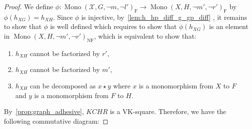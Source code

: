 \begin{proof}
       
        We define $\phi: \operatorname{Mono}(\mathcal{X},G,\lnot m, \lnot l')_{\operatorname{F}} \to \operatorname{Mono}(X,H,\lnot m', \lnot r')_{\operatorname{F}}$ 
        by $\phi(h_{XG}) = h_{XH}$. Since $\phi$ is injective, by~\autoref{lem:h_hp_diff_g_gp_diff} , it remains to show that $\phi$ is well defined which requires to show that $\phi(h_{XG})$ is an element in $\operatorname{Mono}(X,H,\lnot m', \lnot r')_{\operatorname{NF}}$, which is equivalent to show that:
        \begin{enumerate}
            \item $h_{XH}$ cannot be factorized by $r'$,
            \item $h_{XH}$ cannot be factorized by $m'$,
            \item $h_{XH}$ can be decomposed as $x \star y$ where $x$ is a monomorphism from $X$ to $F$ and $y$ is a monomorphism from $F$ to $H$.
        \end{enumerate}

        By~\autoref{prop:graph_adhesive}, $KCHR$ is a VK-square. Therefore, we have the following commutative diagram:


\end{proof}
